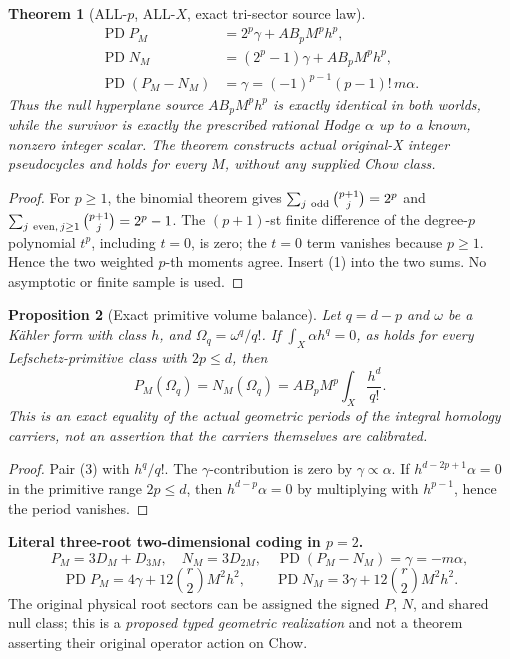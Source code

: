 \documentclass[11pt]{article}
\newtheorem{theorem}{Theorem}[section]
\newtheorem{proposition}[theorem]{Proposition}
\begin{document}
\begin{theorem}[ALL-\(p\), ALL-\(X\), exact tri-sector source law]
\[
\boxed{
\begin{aligned}
\operatorname{PD}P_M&=2^p\gamma+A B_p M^p h^p,\\
\operatorname{PD}N_M&=(2^p-1)\gamma+A B_p M^p h^p,\\
\operatorname{PD}(P_M-N_M)&=\gamma=(-1)^{p-1}(p-1)!\,m\alpha.
\end{aligned}}
\tag{3}
\]
Thus the \emph{null} hyperplane source \(A B_pM^ph^p\) is exactly identical in both worlds, while the survivor is exactly the prescribed rational Hodge \(\alpha\) up to a known, nonzero integer scalar. The theorem constructs actual original-X integer pseudocycles and holds for every \(M\), without any supplied Chow class.
\end{theorem}
\begin{proof}
For \(p\ge1\), the binomial theorem gives
\(\sum_{j\ {\rm odd}}\binom{p+1}j=2^p\) and
\(\sum_{j\ {\rm even},\,j\ge1}\binom{p+1}j=2^p-1\).
The \((p+1)\)-st finite difference of the degree-\(p\) polynomial \(t^p\), including \(t=0\), is zero; the \(t=0\) term vanishes because \(p\ge1\). Hence the two weighted \(p\)-th moments agree. Insert (1) into the two sums. No asymptotic or finite sample is used.
\end{proof}

\begin{proposition}[Exact primitive volume balance]
Let \(q=d-p\) and \(\omega\) be a K\"ahler form with class \(h\), and \(\Omega_q=\omega^q/q!\). If \(\int_X\alpha h^q=0\), as holds for every Lefschetz-primitive class with \(2p\le d\), then
\[
\boxed{P_M(\Omega_q)=N_M(\Omega_q)=
A B_p M^p\int_X\frac{h^d}{q!}.}                              \tag{4}
\]
This is an exact equality of the actual geometric periods of the integral homology carriers, not an assertion that the carriers themselves are calibrated.
\end{proposition}
\begin{proof}
Pair (3) with \(h^q/q!\). The \(\gamma\)-contribution is zero by \(\gamma\propto\alpha\). If \(h^{d-2p+1}\alpha=0\) in the primitive range \(2p\le d\), then \(h^{d-p}\alpha=0\) by multiplying with \(h^{p-1}\), hence the period vanishes.
\end{proof}

\noindent\textbf{Literal three-root two-dimensional coding in \(p=2\).}
\[
P_M=3D_M+D_{3M},\quad N_M=3D_{2M},\quad
\operatorname{PD}(P_M-N_M)=\gamma=-m\alpha,
\]
\[
\operatorname{PD}P_M=4\gamma+12\binom r2M^2h^2,\qquad
\operatorname{PD}N_M=3\gamma+12\binom r2M^2h^2.
\]
The original physical root sectors can be assigned the signed \(P\), \(N\), and shared null class; this is a \emph{proposed typed geometric realization} and not a theorem asserting their original operator action on Chow.
\end{document}
